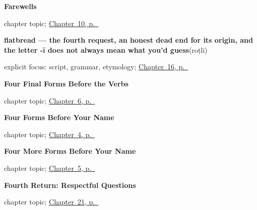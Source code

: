 \noindent\begin{minipage}[t]{\linewidth}
\raggedright
\textbf{Farewells}\par
\footnotesize chapter topic; \hyperref[ch:farewells]{Chapter~10, p.~\pageref*{ch:farewells}}
\end{minipage}\par\smallskip

\noindent\begin{minipage}[t]{\linewidth}
\raggedright
\textbf{flatbread — the fourth request, an honest dead end for its origin, and the letter -ī does not always mean what you'd guess}\enspace\emph{}\enspace(roṭlī)\par
\footnotesize explicit focus: script, grammar, etymology; \hyperref[ch:gu-request-food-drink]{Chapter~16, p.~\pageref*{ch:gu-request-food-drink}}
\end{minipage}\par\smallskip

\noindent\begin{minipage}[t]{\linewidth}
\raggedright
\textbf{Four Final Forms Before the Verbs}\par
\footnotesize chapter topic; \hyperref[ch:gu-final-script-closure-a]{Chapter~6, p.~\pageref*{ch:gu-final-script-closure-a}}
\end{minipage}\par\smallskip

\noindent\begin{minipage}[t]{\linewidth}
\raggedright
\textbf{Four Forms Before Your Name}\par
\footnotesize chapter topic; \hyperref[ch:gu-first-use-forms-a]{Chapter~4, p.~\pageref*{ch:gu-first-use-forms-a}}
\end{minipage}\par\smallskip

\noindent\begin{minipage}[t]{\linewidth}
\raggedright
\textbf{Four More Forms Before Your Name}\par
\footnotesize chapter topic; \hyperref[ch:gu-first-use-forms-b]{Chapter~5, p.~\pageref*{ch:gu-first-use-forms-b}}
\end{minipage}\par\smallskip

\noindent\begin{minipage}[t]{\linewidth}
\raggedright
\textbf{Fourth Return: Respectful Questions}\par
\footnotesize chapter topic; \hyperref[ch:gu-r4-respectful-questions]{Chapter~21, p.~\pageref*{ch:gu-r4-respectful-questions}}
\end{minipage}\par\smallskip

